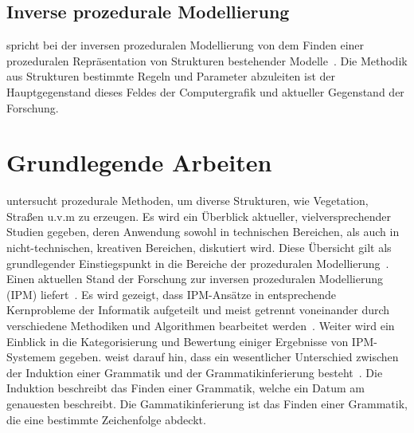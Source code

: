 \subsection*{Inverse prozedurale Modellierung}
\citeauthor{aliaga_2016} spricht bei der inversen prozeduralen Modellierung von dem Finden einer prozeduralen Repräsentation
von Strukturen bestehender Modelle~\cite{aliaga_2016}.
Die Methodik aus Strukturen bestimmte Regeln und Parameter abzuleiten ist der Hauptgegenstand dieses Feldes der
Computergrafik und aktueller Gegenstand der Forschung.

\section{Grundlegende Arbeiten}

\citeauthor{smelik_2014} untersucht prozedurale Methoden, um diverse Strukturen, wie Vegetation, Straßen u.v.m zu erzeugen.
Es wird ein Überblick aktueller, vielversprechender Studien gegeben, deren Anwendung sowohl in technischen Bereichen,
als auch in nicht-technischen, kreativen Bereichen, diskutiert wird.
Diese Übersicht gilt als grundlegender Einstiegspunkt in die Bereiche der prozeduralen
Modellierung~\cite{smelik_2014}.
Einen aktuellen Stand der Forschung zur inversen prozeduralen Modellierung (IPM) liefert~\citeauthor{aliaga_2016}.
Es wird gezeigt, dass IPM-Ansätze in entsprechende Kernprobleme der Informatik aufgeteilt und meist getrennt voneinander durch
verschiedene Methodiken und Algorithmen bearbeitet werden~\cite{aliaga_2016}.
Weiter wird ein Einblick in die Kategorisierung und Bewertung einiger Ergebnisse von IPM-Systemem gegeben.
\citeauthor{higuera_2010} weist darauf hin, dass ein wesentlicher Unterschied zwischen der Induktion einer Grammatik
und der Grammatikinferierung besteht~\cite{higuera_2010}.
Die Induktion beschreibt das Finden einer Grammatik, welche ein Datum am genauesten beschreibt.
Die Gammatikinferierung ist das Finden einer Grammatik, die eine bestimmte Zeichenfolge abdeckt.

\newpage

